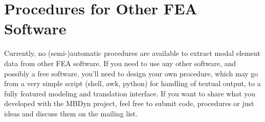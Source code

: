 \section{Procedures for Other FEA Software}
Currently, no (semi-)automatic procedures are available to extract modal
element data from other FEA software.
If you need to use any other software, and possibly a free software,
you'll need to design your own procedure, which may go from a very simple
script (shell, awk, python) for handling of textual output, to a fully
featured modeling and translation interface.
If you want to share what you developed with the MBDyn project, feel free
to submit code, procedures or just ideas and discuss them on the
mailing list.

